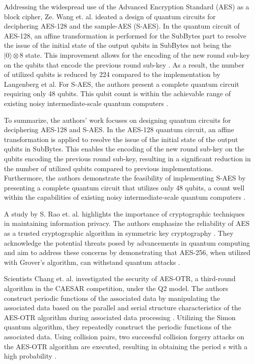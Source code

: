 Addressing the widespread use of the Advanced Encryption Standard (AES) as a block cipher, Ze. Wang et. al. ideated a design of quantum circuits for deciphering AES-128 and the sample-AES (S-AES). In the quantum circuit of AES-128, an affine transformation is performed for the SubBytes part to resolve the issue of the initial state of the output qubits in SubBytes not being the $|0\rangle \otimes 8$ state. This improvement allows for the encoding of the new round sub-key on the qubits that encode the previous round sub-key \cite{wang2022quantumcircuit}. As a result, the number of utilized qubits is reduced by 224 compared to the implementation by Langenberg et al. For S-AES, the authors present a complete quantum circuit requiring only 48 qubits. This qubit count is within the achievable range of existing noisy intermediate-scale quantum computers \cite{zou2020quantum}\cite{rao2017aes}. 


To summarize, the authors' work focuses on designing quantum circuits for deciphering AES-128 and S-AES. In the AES-128 quantum circuit, an affine transformation is applied to resolve the issue of the initial state of the output qubits in SubBytes. This enables the encoding of the new round sub-key on the qubits encoding the previous round sub-key, resulting in a significant reduction in the number of utilized qubits compared to previous implementations. Furthermore, the authors demonstrate the feasibility of implementing S-AES by presenting a complete quantum circuit that utilizes only 48 qubits, a count well within the capabilities of existing noisy intermediate-scale quantum computers \cite{langenberg2020reducing}. 


A study by S. Rao et. al. highlights the importance of cryptographic techniques in maintaining information privacy. The authors emphasize the reliability of AES as a trusted cryptographic algorithm in symmetric key cryptography \cite{rao2017aes}. They acknowledge the potential threats posed by advancements in quantum computing and aim to address these concerns by demonstrating that AES-256, when utilized with Grover's algorithm, can withstand quantum attacks \cite{bonnetain2019quantum}\cite{vanHeesch2019quantum}. 
 

Scientists Chang et. al. investigated the security of AES-OTR, a third-round algorithm in the CAESAR competition, under the Q2 model. The authors construct periodic functions of the associated data by manipulating the associated data based on the parallel and serial structure characteristics of the AES-OTR algorithm during associated data processing \cite{chang2022collision}. Utilizing the Simon quantum algorithm, they repeatedly construct the periodic functions of the associated data. Using collision pairs, two successful collision forgery attacks on the AES-OTR algorithm are executed, resulting in obtaining the period s with a high probability \cite{almazrooie2018quantum}. 
 


